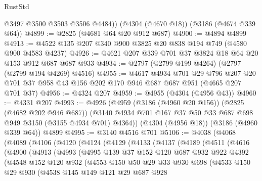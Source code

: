 \begin{lexlean}{RustStd}
\begin{coremodule}
{\begin{coremodule}
{{{{{{{{{{{{{{{{{{{{        @3497
        @3500
        @3503
        @3506
        @4484))
    (@4304 (@4670 @18))
    (@3186 (@4674 @339 @64))
@4899 := @2825 (@4681 @64 @20 @912 @687)
@4900 := @4894 @4899
@4913 := @4522 @135 @207 @340 @900 @3825 @20 @838 @194 @749 (@4580 @900 @4583 @4237)
@4926 := @4621 @207 @339 @701 @37 @3824 @18 @64 @20 @153 @912 @687 @687 @933
@4934 := @2797 (@2799 @199 @4264) (@2797 (@2799 @194 @4269) @4516)
@4955 := @4617
    @4934
    @701
    @29
    @796
    @207
    @20
    @701
    @37
    @958
    @43
    @156
    @202
    @170
    @946
    @687
    @687
    @951
    (@4665 @207 @701 @37)
@4956 := @4324 @207
@4959 := @4955 (@4304 (@4956 @43))
@4960 := @4331 @207
@4993 := @4926
    (@4959
      (@3186 (@4960 @20 @156))
      (@2825 (@4682 @202 @946 @687))
      (@3140 @4934 @701 @167 @37 @50 @33 @687 @698 @949 @3150 (@3155 @4934 @701) @4364))
    (@4304 (@4956 @18))
    (@3186 (@4960 @339 @64))
    @4899
@4995 := @3140 @4516 @701
@5106 := @4038
    (@4068
      (@4089
        (@4106
          (@4120
            (@4124
              (@4129
                (@4133
                  (@4137
                    (@4189
                      (@4511
                        (@4616
                          (@4900
                            (@4913
                              (@4993
                                (@4995
                                  @139
                                  @37
                                  @152
                                  @120
                                  @687
                                  @932
                                  @922
                                  @4392
                                  (@4548
                                    @152
                                    @120
                                    @932
                                    (@4553
                                      @150
                                      @50
                                      @29
                                      @33
                                      @930
                                      @698
                                      (@4533
                                        @150
                                        @29
                                        @930
                                        (@4538
                                          @145
                                          @149
                                          @121
                                          @29
                                          @687
                                          @928
}}}}}}}}}}}}}}}}}}}}
\end{coremodule}}
\end{coremodule}
\end{lexlean}

